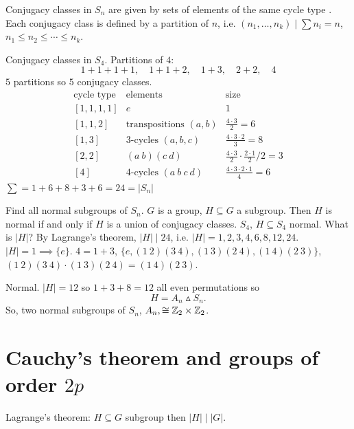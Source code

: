 \documentclass[10pt, a4paper]{article}
\begin{document}
\begin{corollary}
    Conjugacy classes in $S_n$ are given by sets of elements of the same cycle type .
    Each conjugacy class is defined by a partition of $n$,
    i.e. $(n_1, \dotsc, n_k) \mid \sum n_i = n$,
    $n_1 \leq n_2 \leq \dotsi \leq n_k$.
\end{corollary}

\begin{example}
    Conjugacy classes in $S_4$.
    Partitions of $4$:
    \[
    1 + 1 + 1 + 1,\quad 1 + 1 + 2,\quad 1 + 3,\quad 2 + 2,\quad 4
    \]
    $5$ partitions so $5$ conjugacy classes.
    \[
    \begin{array}{c|c|c}
         \text{cycle type} & \text{elements} & \text{size} \\
         \hline
         [1, 1, 1, 1] & e & 1 \\ \phantom{}
         [1, 1, 2] & \text{transpositions } (a, b) & \frac{4 \cdot 3}{2} = 6 \\ \phantom{}
         [1, 3] & 3\text{-cycles } (a, b, c) & \frac{4 \cdot 3 \cdot 2}{3} = 8 \\ \phantom{}
         [2, 2] & (a\ b)(c\ d) & \frac{4 \cdot 3}{2}\cdot \frac{2\cdot 1}{2}\bigr/2 = 3 \\ \phantom{}
         [4] & 4\text{-cycles } (a\ b\ c\ d) & \frac{4\cdot 3\cdot 2\cdot 1}{4} = 6
    \end{array}
    \]
    $\sum = 1 + 6 + 8 + 3 + 6 = 24 = |S_n|$
\end{example}

\begin{example}
    Find all normal subgroups of $S_n$.
    $G$ is a group,
    $H \subseteq G$ a subgroup.
    Then $H$ is normal if and only if $H$ is a union of conjugacy classes.
    $S_4$,
    $H \subseteq S_4$ normal.
    What is $|H|$?
    By Lagrange's theorem,
    $|H| \mid 24$,
    i.e. $|H| = 1, 2, 3, 4, 6, 8, 12, 24$.
    $|H| = 1 \implies \{e\}$.
    $4 = 1 + 3$,
    $\{e, (1\ 2)(3\ 4), (1\ 3)(2\ 4), (1\ 4)(2\ 3)\}$,
    $(1\ 2)(3\ 4) \cdot (1\ 3)(2\ 4) = (1\ 4)(2\ 3)$.

    Normal.
    $|H| = 12$ so $1 + 3 + 8 = 12$ all even permutations so
    \[
    H = A_n \vartriangle S_n.
    \]
    So,
    two normal subgroups of $S_n$,
    $A_n, \cong \mathbb{Z}_2 \times \mathbb{Z}_2$.
\end{example}

\newpage

\section{Cauchy's theorem and groups of order \texorpdfstring{$2p$}{}}
Lagrange's theorem:
$H \subseteq G$ subgroup then $|H| \mid |G|$.
\end{document}
